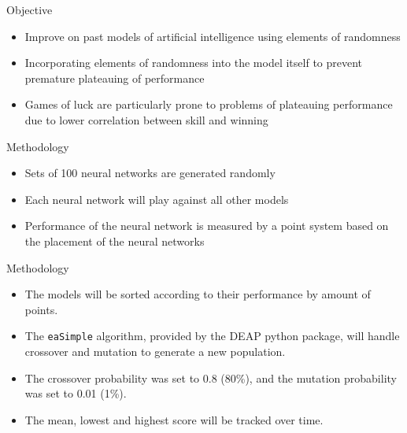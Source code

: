 \documentclass{beamer}
\begin{document}
\begin{frame}{Objective}
	
	\begin{itemize}
		
		\item Improve on past models of artificial intelligence using elements of randomness
		\item Incorporating elements of randomness into the model itself to prevent premature plateauing of performance
		\item Games of luck are particularly prone to problems of plateauing performance due to lower correlation between skill and winning
		
	\end{itemize}
	
\end{frame}


\begin{frame}{Methodology}
	
	\begin{itemize}
	
		\item Sets of 100 neural networks are generated randomly
		\item Each neural network will play against all other models
		\item Performance of the neural network is measured by a point system based on the placement of the neural networks
		
	\end{itemize}
	
\end{frame}

\begin{frame}{Methodology}
	
	\begin{itemize}
		
		\item The models will be sorted according to their performance by amount of points.
		\item The \texttt{eaSimple} algorithm, provided by the DEAP python package, will handle crossover and mutation to generate a new population.
		\item The crossover probability was set to 0.8 (80\%), and the mutation probability was set to 0.01 (1\%).
		\item The mean, lowest and highest score will be tracked over time.
	\end{itemize}
	
\end{frame}
\end{document}
